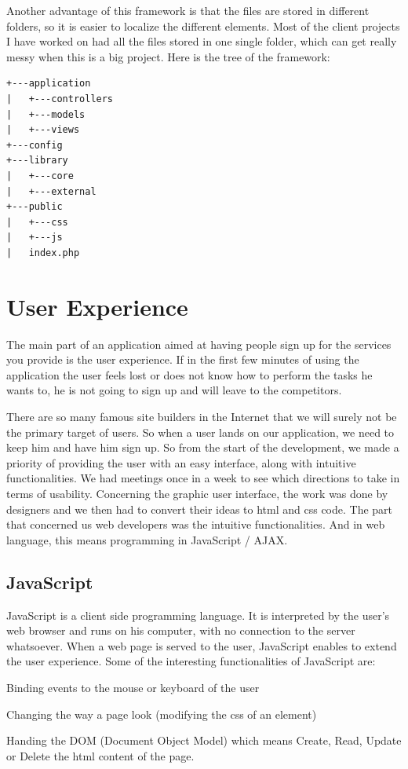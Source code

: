 Another advantage of this framework is that the files are stored in different folders, so it is easier to localize the different elements. Most of the client projects I have worked on had all the files stored in one single folder, which can get really messy when this is a big project.
Here is the tree of the framework:
\begin{verbatim}
+---application
|   +---controllers
|   +---models
|   +---views
+---config
+---library
|   +---core
|   +---external
+---public
|   +---css
|   +---js
|   index.php
\end{verbatim}

\section{User Experience}


The main part of an application aimed at having people sign up for the services you provide is the user experience. If in the first few minutes of using the application the user feels lost or does not know how to perform the tasks he wants to, he is not going to sign up and will leave to the competitors. 

There are so many famous site builders in the Internet that we will surely not be the primary target of users. So when a user lands on our application, we need to keep him and have him sign up. So from the start of the development, we made a priority of providing the user with an easy interface, along with intuitive functionalities.
We had meetings once in a week to see which directions to take in terms of usability. Concerning the graphic user interface, the work was done by designers and we then had to convert their ideas to html and css code. The part that concerned us web developers was the intuitive functionalities. And in web language, this means programming in JavaScript / AJAX.

\subsection{JavaScript}

JavaScript is a client side programming language. It is interpreted by the user's web browser and runs on his computer, with no connection to the server whatsoever. When a web page is served to the user, JavaScript enables to extend the user experience. Some of the interesting functionalities of JavaScript are:
\begin{itemize*}
\item Binding events to the mouse or keyboard of the user
\item Changing the way a page look (modifying the css of an element)
\item Handing the DOM (Document Object Model) which means Create, Read, Update or Delete the html content of the page.
\end{itemize*}

